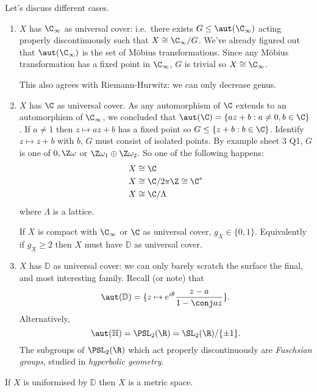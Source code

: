 \documentclass[a4paper]{article}
\begin{document}
Let's discuss different cases.
\begin{enumerate}
\item \(X\) has \(\C_\infty\) as universal cover: i.e.\ there exists \(G \leq \aut(\C_\infty)\) acting properly discontinuously such that \(X \cong \C_\infty/G\). We've already figured out that \(\aut(\C_\infty)\) is the set of Möbius transformations. Since any Möbius transformation has a fixed point in \(\C_\infty\), \(G\) is trivial so \(X \cong \C_\infty\).

  This also agrees with Riemann-Hurwitz: we can only decrease genus.
\item \(X\) has \(\C\) as universal cover. As any automorphism of \(\C\) extends to an automorphism of \(\C_\infty\), we concluded that \(\aut(\C) = \{az + b: a \neq 0, b \in \C\}\). If \(a \neq 1\) then \(z \mapsto az + b\) has a fixed point so \(G \leq \{z + b: b \in \C\}\). Identify \(z \mapsto z + b\) with \(b\), \(G\) must consist of isolated points. By example sheet 3 Q1, \(G\) is one of \(0, \Z\omega\) or \(\Z \omega_1 \oplus \Z \omega_2\). So one of the following happens:
  \begin{align*}
    X &\cong \C \\
    X &\cong \C/2\pi\Z \cong \C^* \\
    X &\cong \C/\Lambda
  \end{align*}
  where \(\Lambda\) is a lattice.

  \begin{remark}
    If \(X\) is compact with \(\C_\infty\) or \(\C\) as universal cover, \(g_X \in \{0, 1\}\). Equivalently if \(g_X \geq 2\) then \(X\) must have \(\mathbb D\) as universal cover.
  \end{remark}
\item \(X\) has \(\mathbb D\) as universal cover: we can only barely scratch the surface the final, and most interesting family. Recall (or note) that
  \[
    \aut(\mathbb D) = \{z \mapsto e^{i\theta} \frac{z - a}{1 - \conj a z}\}.
  \]
  Alternatively,
  \[
    \aut(\mathbb H) = \PSL_2(\R) = \SL_2(\R)/\{\pm 1\}.
  \]
  The subgroups of \(\PSL_2(\R)\) which act properly discontinuously are \emph{Fuschsian groups}, studied in \emph{hyperbolic geometry}.
\end{enumerate}

\begin{corollary}
  If \(X\) is uniformised by \(\mathbb D\) then \(X\) is a metric space.
\end{corollary}
\end{document}

